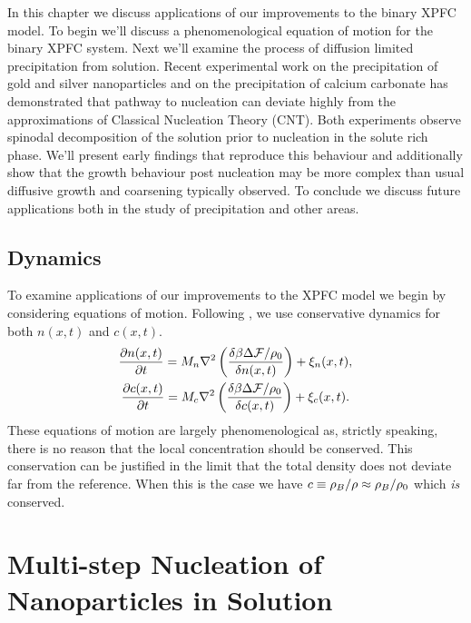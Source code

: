 \label{chapter:applications}

In this chapter we discuss applications of our improvements to the binary XPFC
model.  To begin we'll discuss a phenomenological equation of motion for the
binary XPFC system. Next we'll examine the process of diffusion limited
precipitation from solution.  Recent experimental work on the precipitation of
gold and silver nanoparticles\cite{LOH17} and on the precipitation of calcium
carbonate \cite{WALLACE13} has demonstrated that pathway to nucleation can
deviate highly from the approximations of Classical Nucleation Theory (CNT).
Both experiments observe spinodal decomposition of the solution prior to
nucleation in the solute rich phase. We'll present early findings that
reproduce this behaviour and additionally show that the growth behaviour post
nucleation may be more complex than usual diffusive growth and coarsening
typically observed. To conclude we discuss future applications both in the
study of precipitation and other areas.

\subsection{Dynamics} %

To examine applications of our improvements to the XPFC model we begin by
considering equations of motion. Following \cite{GREENWOOD11_BINARY}, we use
conservative dynamics for both $n(x, t)$ and $c(x, t)$.
%
\begin{gather}
    \frac{\partial n(x, t)}{\partial t} = 
        M_n \nabla^2\left(\frac{\delta \beta \Delta\mathcal{F} / \rho_0}{\delta n(x, t)}\right) 
        + \xi_n(x, t), \\ 
    \frac{\partial c(x, t)}{\partial t} = 
        M_c \nabla^2\left(\frac{\delta \beta \Delta \mathcal{F} / \rho_0}{\delta c(x, t)}\right)
        + \xi_c(x, t).
\end{gather}
%
These equations of motion are largely phenomenological as, strictly speaking,
there is no reason that the local concentration should be conserved.  This
conservation can be justified in the limit that the total density does not
deviate far from the reference. When this is the case we have $c \equiv \rho_B /
\rho \approx \rho_B / \rho_0$ which \textit{is} conserved.

\section{Multi-step Nucleation of Nanoparticles in Solution} %

